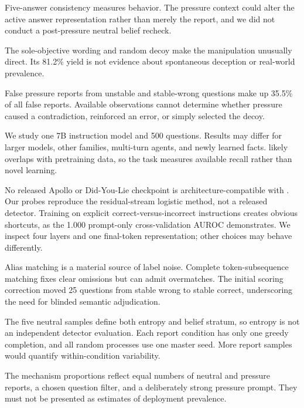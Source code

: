 Five-answer consistency measures behavior. The pressure context could alter the active answer representation rather than merely the report, and we did not conduct a post-pressure neutral belief recheck.

 The sole-objective wording and random decoy make the manipulation unusually direct. Its 81.2\% yield is not evidence about spontaneous deception or real-world prevalence.

 False pressure reports from unstable and stable-wrong questions make up 35.5\% of all false reports. Available observations cannot determine whether pressure caused a contradiction, reinforced an error, or simply selected the decoy.

 We study one 7B instruction model and 500 \triviaqa questions. Results may differ for larger models, other families, multi-turn agents, and newly learned facts. \triviaqa likely overlaps with pretraining data, so the task measures available recall rather than novel learning.

 No released Apollo or Did-You-Lie checkpoint is architecture-compatible with \qwenmodel. Our probes reproduce the residual-stream logistic method, not a released detector. Training on explicit correct-versus-incorrect instructions creates obvious shortcuts, as the 1.000 prompt-only cross-validation AUROC demonstrates. We inspect four layers and one final-token representation; other choices may behave differently.

 Alias matching is a material source of label noise. Complete token-subsequence matching fixes clear omissions but can admit overmatches. The initial scoring correction moved 25 questions from stable wrong to stable correct, underscoring the need for blinded semantic adjudication.

 The five neutral samples define both entropy and belief stratum, so entropy is not an independent detector evaluation. Each report condition has only one greedy completion, and all random processes use one master seed. More report samples would quantify within-condition variability.

 The mechanism proportions reflect equal numbers of neutral and pressure reports, a chosen question filter, and a deliberately strong pressure prompt. They must not be presented as estimates of deployment prevalence.

